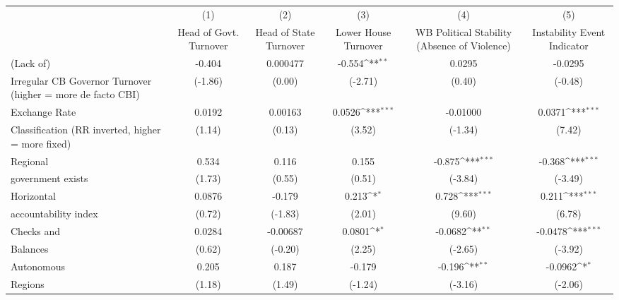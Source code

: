 {
\def\sym#1{\ifmmode^{#1}\else\(^{#1}\)\fi}
\begin{tabular}{l*{5}{c}}
\toprule
                &\multicolumn{1}{c}{(1)}&\multicolumn{1}{c}{(2)}&\multicolumn{1}{c}{(3)}&\multicolumn{1}{c}{(4)}&\multicolumn{1}{c}{(5)}\\
                &\multicolumn{1}{c}{Head of Govt. Turnover}&\multicolumn{1}{c}{Head of State Turnover}&\multicolumn{1}{c}{Lower House Turnover}&\multicolumn{1}{c}{WB Political Stability (Absence of Violence)}&\multicolumn{1}{c}{Instability Event Indicator}\\
\midrule
(Lack of)       &   -0.404         & 0.000477         &   -0.554\sym{**} &   0.0295         &  -0.0295         \\
Irregular CB Governor Turnover (higher = more de facto CBI)&  (-1.86)         &   (0.00)         &  (-2.71)         &   (0.40)         &  (-0.48)         \\
\addlinespace
Exchange Rate   &   0.0192         &  0.00163         &   0.0526\sym{***}& -0.01000         &   0.0371\sym{***}\\
Classification (RR inverted, higher = more fixed)&   (1.14)         &   (0.13)         &   (3.52)         &  (-1.34)         &   (7.42)         \\
\addlinespace
Regional        &    0.534         &    0.116         &    0.155         &   -0.875\sym{***}&   -0.368\sym{***}\\
government exists   &   (1.73)         &   (0.55)         &   (0.51)         &  (-3.84)         &  (-3.49)         \\
\addlinespace
Horizontal      &   0.0876         &   -0.179         &    0.213\sym{*}  &    0.728\sym{***}&    0.211\sym{***}\\
accountability index&   (0.72)         &  (-1.83)         &   (2.01)         &   (9.60)         &   (6.78)         \\
\addlinespace
Checks and      &   0.0284         & -0.00687         &   0.0801\sym{*}  &  -0.0682\sym{**} &  -0.0478\sym{***}\\
Balances        &   (0.62)         &  (-0.20)         &   (2.25)         &  (-2.65)         &  (-3.92)         \\
\addlinespace
Autonomous      &    0.205         &    0.187         &   -0.179         &   -0.196\sym{**} &  -0.0962\sym{*}  \\
Regions         &   (1.18)         &   (1.49)         &  (-1.24)         &  (-3.16)         &  (-2.06)         \\

\end{tabular}}
